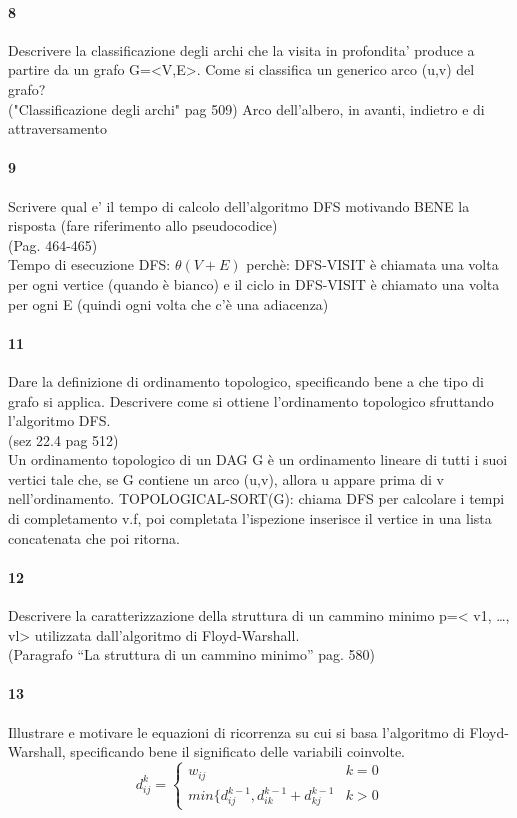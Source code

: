 \documentclass[12pt, a4paper, openany]{book}
\begin{document}
	\paragraph{8}
	Descrivere la classificazione degli archi che la visita in profondita’ produce a
	partire da un grafo G=<V,E>. Come si classifica un generico arco (u,v) del
	grafo?\\
	("Classificazione degli archi" pag 509)
	Arco dell'albero, in avanti, indietro e di attraversamento
	\paragraph{9}
	Scrivere qual e’ il tempo di calcolo dell’algoritmo DFS motivando BENE la
	risposta (fare riferimento allo pseudocodice)\\
	(Pag. 464-465)\\
	Tempo di esecuzione DFS: $\theta(V+E)$ perchè: DFS-VISIT è chiamata una volta per ogni vertice (quando è bianco) e il ciclo in DFS-VISIT è chiamato una volta per ogni E (quindi ogni volta che c'è una adiacenza)
\paragraph{11}
Dare la definizione di ordinamento topologico, specificando bene a che tipo di
grafo si applica. Descrivere come si ottiene l’ordinamento topologico
sfruttando l’algoritmo DFS.\\
(sez 22.4 pag 512)\\
Un ordinamento topologico di un DAG G è un ordinamento lineare di tutti i suoi vertici tale che, se G contiene un arco (u,v), allora u appare prima di v nell'ordinamento.
TOPOLOGICAL-SORT(G): chiama DFS per calcolare i tempi di completamento v.f, poi completata l'ispezione inserisce il vertice in una lista concatenata che poi ritorna.

\paragraph{12}
Descrivere la caratterizzazione della struttura di un cammino minimo p=< v1,
…, vl> utilizzata dall’algoritmo di Floyd-Warshall.\\
(Paragrafo “La struttura di un cammino minimo” pag. 580)\\
\paragraph{13}
Illustrare e motivare le equazioni di ricorrenza su cui si basa l’algoritmo di
Floyd-Warshall, specificando bene il significato delle variabili coinvolte.
\begin{equation*}
	d_{ij}^k = \begin{cases}
		w_{ij}                                        & k=0 \\
		min\{d_{ij}^{k-1},d_{ik}^{k-1} + d_{kj}^{k-1} & k>0
	\end{cases}
\end{equation*}
\end{document}
